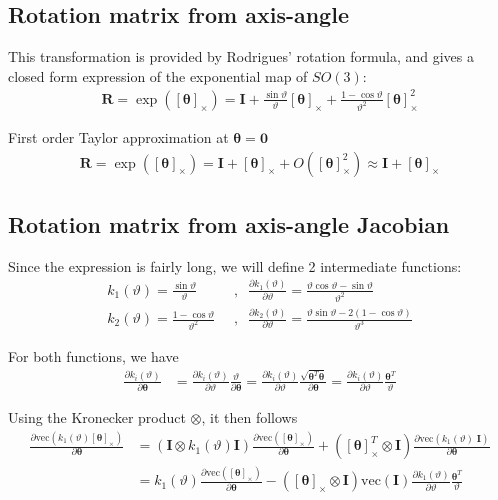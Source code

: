 \documentclass{article}
\renewcommand\aa{\bm{\theta}}
\renewcommand\t{\vartheta}
\newcommand\R{\bm{R}}
\newcommand\I{\bm{I}}
\renewcommand\skew[1]{[#1]_{\times}}
\newcommand\vecop[1]{\text{vec} \left( #1\right)}
\begin{document}
\subsection{Rotation matrix from axis-angle}
This transformation is provided by Rodrigues' rotation formula, and gives a closed form expression of the exponential map of $SO(3)$:
\begin{align}
  \R = \exp(\skew{\aa}) = \I + \frac{\sin \t}{\t} \skew{\aa} + \frac{1 - \cos \t}{\t^2} \skew{\aa}^2 
\end{align}

First order Taylor approximation at $\aa = \bm{0}$
\begin{align}
  \R = \exp(\skew{\aa}) = \I + \skew{\aa} + O(\skew{\aa}^2) \approx \I + \skew{\aa}
\end{align}

\subsection{Rotation matrix from axis-angle Jacobian}
Since the expression is fairly long, we will define 2 intermediate functions:
\begin{align}
  k_1(\t) = \frac{\sin{\t}}{\t} \;\;&,\;\;
  \frac{\partial k_1(\t)}{\partial \t} = \frac{\t\cos{\t} - \sin{\t}}{\t^2} \\
  k_2(\t) = \frac{1-\cos{\t}}{\t^2} \;\;&,\;\;
  \frac{\partial k_2(\t)}{\partial \t} = \frac{\t\sin{\t} - 2\left(1-\cos{\t} \right)}{\t^3}
\end{align}

For both functions, we have
\begin{align}
  \frac{\partial k_i(\t)}{\partial \aa} &= 
    \frac{\partial k_i(\t)}{\partial \t} \frac{\t}{\partial \aa} =
    \frac{\partial k_i(\t)}{\partial \t} \frac{\sqrt{\aa^T\aa}}{\partial \aa} =
    \frac{\partial k_i(\t)}{\partial \t} \frac{\aa^T}{\t}
\end{align}

Using the Kronecker product $\otimes$, it then follows
\begin{align}
  \frac{\partial \vecop{k_1(\t) \skew{\aa}}}{\partial \aa}  
  &= \left( \I \otimes k_1(\t)\I \right) \frac{\partial \vecop{\skew{\aa}}}{\partial \aa}
    + \left(\skew{\aa}^T \otimes \I \right) \frac{\partial \vecop{k_1(\t)\;\I}}{\partial \aa} \\
  &= k_1(\t) \frac{\partial \vecop{\skew{\aa}}}{\partial \aa}
    - \left(\skew{\aa} \otimes \I \right) \vecop{\I} \frac{\partial k_1(\t)}{\partial \t} \frac{\aa^T}{\t}
\end{align}
\end{document}
